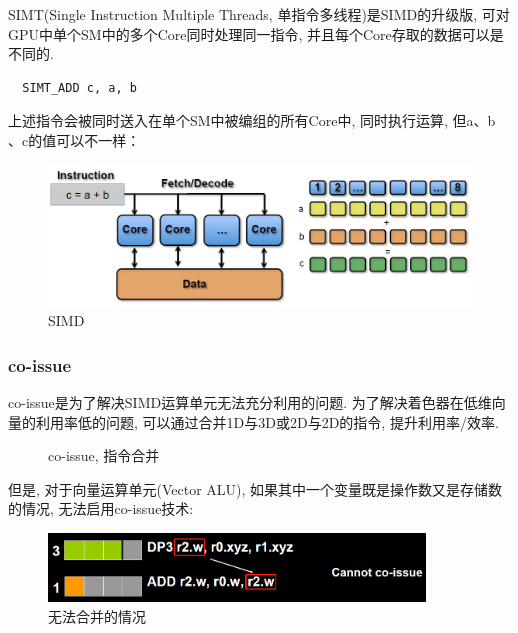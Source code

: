 \documentclass[UTF8]{ctexart}
\begin{document}
SIMT(Single Instruction Multiple Threads, 单指令多线程)是SIMD的升级版, 可对GPU中单个SM中的多个Core同时处理同一指令, 并且每个Core存取的数据可以是不同的.
\begin{verbatim}
  SIMT_ADD c, a, b
\end{verbatim}
上述指令会被同时送入在单个SM中被编组的所有Core中, 同时执行运算, 但a、b 、c的值可以不一样：

\begin{figure}[H]
  \includegraphics[width=12cm]{simt.png}
  \centering
  \caption{SIMD}
  \label{fig:simt}
\end{figure}

\subsubsection{co-issue}
co-issue是为了解决SIMD运算单元无法充分利用的问题. 为了解决着色器在低维向量的利用率低的问题, 可以通过合并1D与3D或2D与2D的指令, 提升利用率/效率.

\begin{figure}[H]
  \centering
  \caption{co-issue, 指令合并}
  \label{fig: co-issue}
\end{figure}

但是, 对于向量运算单元(Vector ALU), 如果其中一个变量既是操作数又是存储数的情况, 无法启用co-issue技术:

\begin{figure}[H]
  \includegraphics[width=10cm]{co-issue_2.png}
  \centering
  \caption{无法合并的情况}
  \label{fig:co-issue-unable}
\end{figure}
\end{document}
